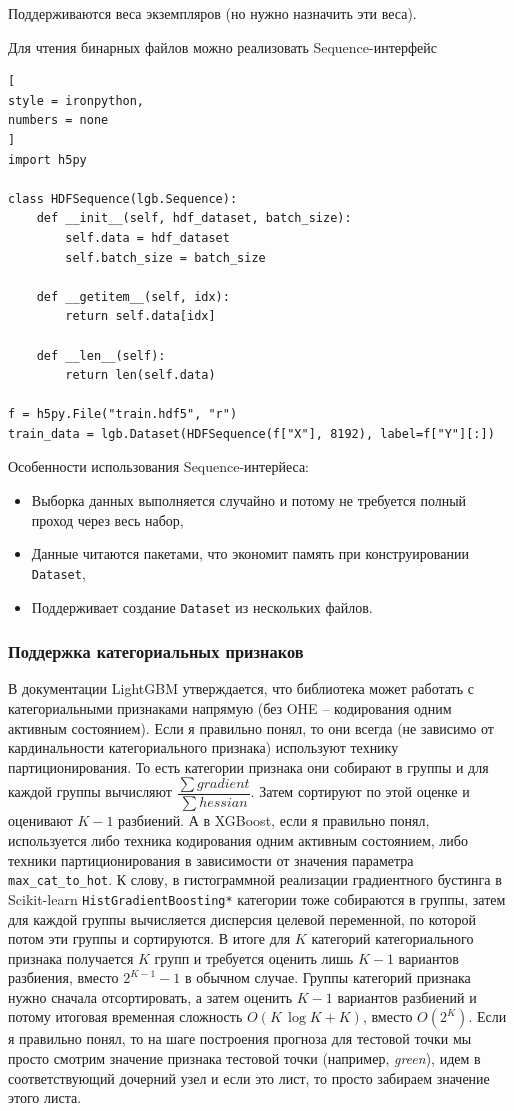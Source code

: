 \documentclass[%
	11pt,
	a4paper,
	utf8,
		]{article}
\begin{document}
Поддерживаются веса экземпляров (но нужно назначить эти веса). 

Для чтения бинарных файлов можно реализовать Sequence-интерфейс
\begin{lstlisting}[
style = ironpython,
numbers = none
]
import h5py

class HDFSequence(lgb.Sequence):
    def __init__(self, hdf_dataset, batch_size):
        self.data = hdf_dataset
        self.batch_size = batch_size
        
    def __getitem__(self, idx):
        return self.data[idx]
        
    def __len__(self):
        return len(self.data)
        
f = h5py.File("train.hdf5", "r")
train_data = lgb.Dataset(HDFSequence(f["X"], 8192), label=f["Y"][:])
\end{lstlisting}

Особенности использования Sequence-интерйеса:
\begin{itemize}
	\item Выборка данных выполняется случайно и потому не требуется полный проход через весь набор,
	
	\item Данные читаются пакетами, что экономит память при конструировании \verb|Dataset|,
	
	\item Поддерживает создание \verb|Dataset| из нескольких файлов.
\end{itemize}

\subsubsection{Поддержка категориальных признаков}

В документации LightGBM утверждается, что библиотека может работать с категориальными признаками напрямую (без OHE -- кодирования одним активным состоянием). Если я правильно понял, то они всегда (не зависимо от кардинальности категориального признака) используют технику партиционирования. То есть категории признака они собирают в группы и для каждой группы вычисляют $ \dfrac{ \sum gradient }{ \sum hessian } $. Затем сортируют по этой оценке и оценивают $ K - 1 $ разбиений. А в XGBoost, если я правильно понял, используется либо техника кодирования одним активным состоянием, либо техники партиционирования в зависимости от значения параметра \verb|max_cat_to_hot|. К слову, в гистограммной реализации градиентного бустинга в Scikit-learn \verb|HistGradientBoosting*| категории тоже собираются в группы, затем для каждой группы вычисляется дисперсия целевой переменной, по которой потом эти группы и сортируются. В итоге для $ K $ категорий категориального признака получается $ K $ групп и требуется оценить лишь $ K - 1 $ вариантов разбиения, вместо $ 2^{K - 1} - 1 $ в обычном случае. Группы категорий признака нужно сначала отсортировать, а затем оценить $ K - 1 $ вариантов разбиений и потому итоговая временная сложность $ O(K \, \log K + K) $, вместо $ O(2^K) $. Если я правильно понял, то на шаге построения прогноза для тестовой точки мы просто смотрим значение признака тестовой точки (например, \emph{green}), идем в соответствующий дочерний узел и если это лист, то просто забираем значение этого листа.
\end{document}
